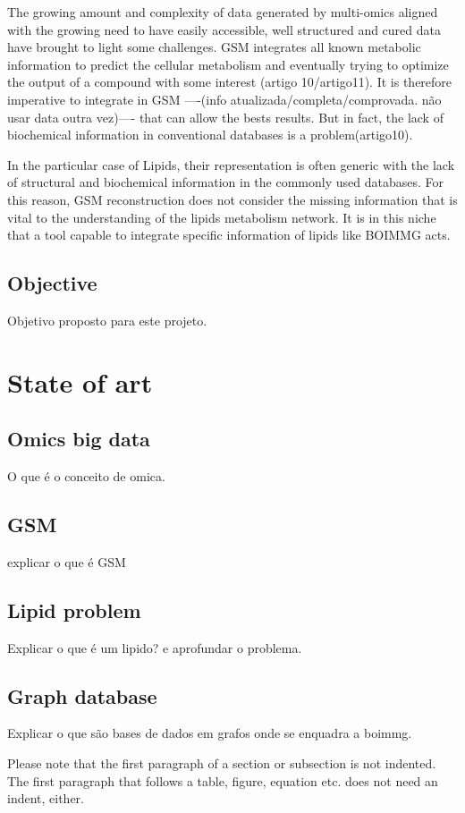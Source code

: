 \documentclass{llncs}
\begin{document}
The growing amount and complexity of data generated by multi-omics aligned with the growing need to have easily accessible, 
well structured and cured data have brought to light some challenges. GSM integrates all known metabolic information to predict the cellular metabolism and eventually 
trying to optimize the output of a compound with some interest (artigo 10/artigo11). It is therefore imperative to integrate in GSM ----(info atualizada/completa/comprovada. não usar data outra vez)---- that can allow the bests results.
But in fact, the lack of biochemical information in conventional databases is a problem(artigo10). 

In the particular case of Lipids, their representation is often generic
with the lack of structural and biochemical information in the commonly used databases. For this reason, GSM reconstruction does not consider the missing information that is vital to the understanding of the lipids metabolism network.
It is in this niche that a tool capable to integrate specific information of lipids like BOIMMG acts.



\subsection{Objective}
Objetivo proposto para este projeto.
\section{State of art}
\subsection{Omics big data}
O que é o conceito de omica.
\subsection{GSM}
explicar o que é GSM
\subsection{Lipid problem}
Explicar o que é um lipido? e aprofundar o problema.
\subsection{Graph database}
Explicar o que são bases de dados em grafos onde se enquadra a boimmg.

Please note that the first paragraph of a section or subsection is
not indented. The first paragraph that follows a table, figure,
equation etc. does not need an indent, either.
\end{document}
